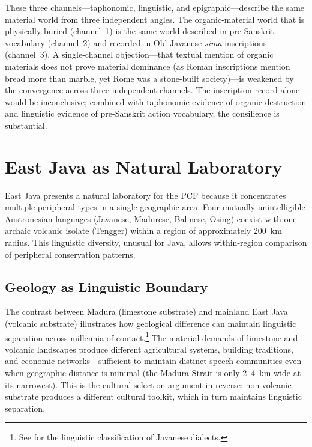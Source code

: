 \documentclass[12pt,a4paper]{article}
\begin{document}
These three channels---taphonomic, linguistic, and epigraphic---describe the same material world from three independent angles. The organic-material world that is physically buried (channel~1) is the same world described in pre-Sanskrit vocabulary (channel~2) and recorded in Old Javanese \emph{sima} inscriptions (channel~3). A single-channel objection---that textual mention of organic materials does not prove material dominance (as Roman inscriptions mention bread more than marble, yet Rome was a stone-built society)---is weakened by the convergence across three independent channels. The inscription record alone would be inconclusive; combined with taphonomic evidence of organic destruction and linguistic evidence of pre-Sanskrit action vocabulary, the consilience is substantial.

\section{East Java as Natural Laboratory}
\label{sec:eastjava}

East Java presents a natural laboratory for the PCF because it concentrates multiple peripheral types in a single geographic area. Four mutually unintelligible Austronesian languages (Javanese, Madurese, Balinese, Osing) coexist with one archaic volcanic isolate (Tengger) within a region of approximately 200~km radius. This linguistic diversity, unusual for Java, allows within-region comparison of peripheral conservation patterns.

\subsection{Geology as Linguistic Boundary}

The contrast between Madura (limestone substrate) and mainland East Java (volcanic substrate) illustrates how geological difference can maintain linguistic separation across millennia of contact.\footnote{See \autocite{nothofer1975reconstruction} for the linguistic classification of Javanese dialects.} The material demands of limestone and volcanic landscapes produce different agricultural systems, building traditions, and economic networks---sufficient to maintain distinct speech communities even when geographic distance is minimal (the Madura Strait is only 2--4~km wide at its narrowest). This is the cultural selection argument in reverse: non-volcanic substrate produces a different cultural toolkit, which in turn maintains linguistic separation.
\end{document}
